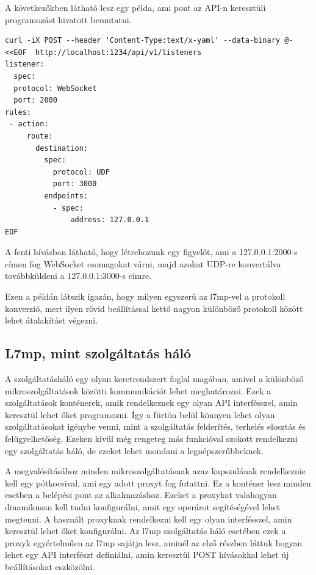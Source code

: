 A következőkben látható lesz egy példa, ami pont az API-n keresztüli programozást
hivatott bemutatni. 

\begin{lstlisting}
curl -iX POST --header 'Content-Type:text/x-yaml' --data-binary @- <<EOF  http://localhost:1234/api/v1/listeners
listener:
  spec:
  protocol: WebSocket
  port: 2000
rules:
 - action:
     route:
       destination:
         spec:
           protocol: UDP
           port: 3000
         endpoints:
           - spec:
               address: 127.0.0.1
EOF
\end{lstlisting}

A fenti hívásban látható, hogy létrehozunk egy figyelőt, ami a 127.0.0.1:2000-s
címen fog WebSocket csomagokat várni, majd azokat UDP-re konvertálva továbbküldeni 
a 127.0.0.1:3000-s címre.

Ezen a példán látszik igazán, hogy milyen egyszerű az l7mp-vel a protokoll konverzió,
mert ilyen rövid beállítással kettő nagyon különböző protokoll között lehet 
átalakítást végezni.

\subsection{L7mp, mint szolgáltatás háló}

A szolgáltatásháló egy olyan keretrendszert foglal magában, amivel a különböző 
mikroszolgáltatások közötti kommunikációt lehet meghatározni. Ezek a szolgáltatások 
konténerek, amik rendelkeznek egy olyan API interfésszel, amin keresztül lehet 
őket programozni. Így a fürtön belül könnyen lehet olyan szolgáltatásokat 
igénybe venni, mint a szolgáltatás felderítés, terhelés elosztás és felügyelhetőség.
Ezeken kívül még rengeteg más funkcióval szokott rendelkezni egy szolgáltatás háló,
de ezeket lehet mondani a legnépszerűbbeknek.

A megvalósításához minden mikroszolgáltatásnak azaz kapszulának rendelkeznie kell 
egy pótkocsival, ami egy adott proxyt fog futattni. Ez a konténer lesz minden esetben
a belépési pont az alkalmazáshoz. Ezeket a proxykat valahogyan dinamikusan kell tudni
konfigurálni, amit egy operárot segítéségével lehet megtenni. A használt proxyknak 
rendelkezni kell egy olyan interfésszel, amin keresztül lehet őket konfigurálni. 
Az l7mp szolgáltatás háló esetében ezek a proxyk egyértelműen az l7mp sajátja lesz,
aminél az elző részben láttuk hogyan lehet egy API interfészt definiálni, amin 
keresztül POST hívásokkal lehet új beállításokat eszközölni.

